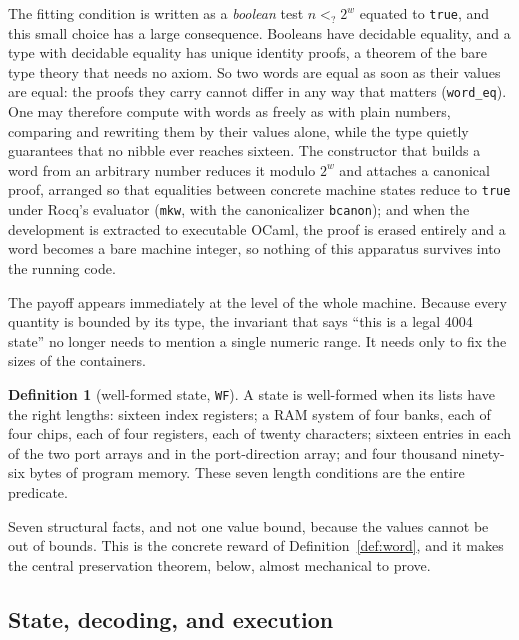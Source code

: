 \documentclass[11pt]{amsart}
\theoremstyle{plain}
\theoremstyle{definition}
\newtheorem{definition}[theorem]{Definition}
\newcommand{\code}[1]{\texttt{#1}}
\begin{document}
The fitting condition is written as a \emph{boolean} test $n <_? 2^w$ equated to \code{true}, and this small choice has a large consequence. Booleans have decidable equality, and a type with decidable equality has unique identity proofs, a theorem of the bare type theory that needs no axiom. So two words are equal as soon as their values are equal: the proofs they carry cannot differ in any way that matters (\code{word\_eq}). One may therefore compute with words as freely as with plain numbers, comparing and rewriting them by their values alone, while the type quietly guarantees that no nibble ever reaches sixteen. The constructor that builds a word from an arbitrary number reduces it modulo $2^w$ and attaches a canonical proof, arranged so that equalities between concrete machine states reduce to \code{true} under Rocq's evaluator (\code{mkw}, with the canonicalizer \code{bcanon}); and when the development is extracted to executable OCaml, the proof is erased entirely and a word becomes a bare machine integer, so nothing of this apparatus survives into the running code.

The payoff appears immediately at the level of the whole machine. Because every quantity is bounded by its type, the invariant that says ``this is a legal 4004 state'' no longer needs to mention a single numeric range. It needs only to fix the sizes of the containers.

\begin{definition}[well-formed state, \code{WF}]\label{def:wf}
A state is well-formed when its lists have the right lengths: sixteen index registers; a RAM system of four banks, each of four chips, each of four registers, each of twenty characters; sixteen entries in each of the two port arrays and in the port-direction array; and four thousand ninety-six bytes of program memory. These seven length conditions are the entire predicate.
\end{definition}

Seven structural facts, and not one value bound, because the values cannot be out of bounds. This is the concrete reward of Definition~\ref{def:word}, and it makes the central preservation theorem, below, almost mechanical to prove.

\subsection{State, decoding, and execution}
\end{document}
